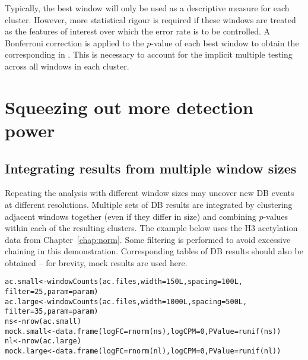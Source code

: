 \documentclass{report}\usepackage[]{graphicx}\usepackage[usenames,dvipsnames]{color}
\newcommand{\hlnum}[1]{\textcolor[rgb]{0.816,0.125,0.439}{#1}}%
\newcommand{\hlstd}[1]{\textcolor[rgb]{0.251,0.251,0.251}{#1}}%
\newcommand{\hlkwb}[1]{\textcolor[rgb]{0,0,0}{#1}}%
\newcommand{\hlkwc}[1]{\textcolor[rgb]{0.251,0.251,0.251}{#1}}%
\newcommand{\hlkwd}[1]{\textcolor[rgb]{0.878,0.439,0.125}{#1}}%
\newenvironment{knitrout}{}{} %
\begin{document}
Typically, the best window will only be used as a descriptive measure for each cluster.
However, more statistical rigour is required if these windows are treated as the features of interest over which the error rate is to be controlled.
A Bonferroni correction is applied to the $p$-value of each best window to obtain the corresponding  in .
This is necessary to account for the implicit multiple testing across all windows in each cluster.

\section{Squeezing out more detection power}

\subsection{Integrating results from multiple window sizes}
\label{sec:bin_integrate}
Repeating the analysis with different window sizes may uncover new DB events at different resolutions.
Multiple sets of DB results are integrated by clustering adjacent windows together (even if they differ in size) and combining $p$-values within each of the resulting clusters.
The example below uses the H3 acetylation data from Chapter~\ref{chap:norm}.
Some filtering is performed to avoid excessive chaining in this demonstration.
Corresponding tables of DB results should also be obtained -- for brevity, mock results are used here.

\begin{knitrout}
\color{fgcolor}\begin{kframe}
\begin{alltt}
\hlstd{ac.small} \hlkwb{<-} \hlkwd{windowCounts}\hlstd{(ac.files,} \hlkwc{width}\hlstd{=}\hlnum{150L}\hlstd{,} \hlkwc{spacing}\hlstd{=}\hlnum{100L}\hlstd{,}
                         \hlkwc{filter}\hlstd{=}\hlnum{25}\hlstd{,} \hlkwc{param}\hlstd{=param)}
\hlstd{ac.large} \hlkwb{<-} \hlkwd{windowCounts}\hlstd{(ac.files,} \hlkwc{width}\hlstd{=}\hlnum{1000L}\hlstd{,} \hlkwc{spacing}\hlstd{=}\hlnum{500L}\hlstd{,}
                         \hlkwc{filter}\hlstd{=}\hlnum{35}\hlstd{,} \hlkwc{param}\hlstd{=param)}
\hlstd{ns} \hlkwb{<-} \hlkwd{nrow}\hlstd{(ac.small)}
\hlstd{mock.small} \hlkwb{<-} \hlkwd{data.frame}\hlstd{(}\hlkwc{logFC}\hlstd{=}\hlkwd{rnorm}\hlstd{(ns),} \hlkwc{logCPM}\hlstd{=}\hlnum{0}\hlstd{,} \hlkwc{PValue}\hlstd{=}\hlkwd{runif}\hlstd{(ns))}
\hlstd{nl} \hlkwb{<-} \hlkwd{nrow}\hlstd{(ac.large)}
\hlstd{mock.large} \hlkwb{<-} \hlkwd{data.frame}\hlstd{(}\hlkwc{logFC}\hlstd{=}\hlkwd{rnorm}\hlstd{(nl),} \hlkwc{logCPM}\hlstd{=}\hlnum{0}\hlstd{,} \hlkwc{PValue}\hlstd{=}\hlkwd{runif}\hlstd{(nl))}
\end{alltt}
\end{kframe}
\end{knitrout}
\end{document}
